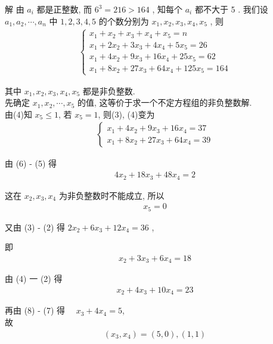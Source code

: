 	解 由 $a_{i}$ 都是正整数, 而 $6^{3}=216>164$ , 知每个 $a_{i}$ 都不大于 5 . 我们设 $a_{1}, a_{2}, \cdots, a_{n}$ 中 $1,2,3,4,5$ 的个数分别为 $x_{1}, x_{2}, x_{3}, x_{4}, x_{5}$ , 则
\begin{align*}
		\left\{\begin{array}{l}
			       x_{1}+x_{2}+x_{3}+x_{4}+x_{5}=n            \\
			       x_{1}+2 x_{2}+3 x_{3}+4 x_{4}+5 x_{5}=26   \\
			       x_{1}+4 x_{2}+9 x_{3}+16 x_{4}+25 x_{5}=62 \\
			       x_{1}+8 x_{2}+27 x_{3}+64 x_{4}+125 x_{5}=164
		       \end{array}\right.
	\end{align*}

	其中 $x_{1}, x_{2}, x_{3}, x_{4}, x_{5}$ 都是非负整数.\\
	先确定 $x_{1}, x_{2}, \cdots, x_{5}$ 的值, 这等价于求一个不定方程组的非负整数解. \\
	由(4)知 $x_{5} \leqslant 1$, 若 $x_{5}=1$, 则(3), (4)变为
\begin{align*}
		\left\{\begin{array}{l}
			       x_{1}+4 x_{2}+9 x_{3}+16 x_{4}=37 \\
			       x_{1}+8 x_{2}+27 x_{3}+64 x_{4}=39
		       \end{array}\right.
	\end{align*}

	由 (6) - (5) 得
\begin{align*}
		4 x_{2}+18 x_{3}+48 x_{4}=2
	\end{align*}

	这在 $x_{2} ,  x_{3} ,  x_{4}$ 为非负整数时不能成立, 所以
\begin{align*}
		x_{5}=0
	\end{align*}

	又由 (3) - (2) 得 $2 x_{2}+6 x_{3}+12 x_{4}=36$ ,

	即
\begin{align*}
		x_{2}+3 x_{3}+6 x_{4}=18
	\end{align*}

	由 (4) 一 (2) 得
\begin{align*}
		x_{2}+4 x_{3}+10 x_{4}=23
	\end{align*}

	再由 (8) - (7) 得 $\quad x_{3}+4 x_{4}=5$,\\
	故
\begin{align*}
		\left(x_{3}, x_{4}\right)=(5,0),(1,1)
	\end{align*}

